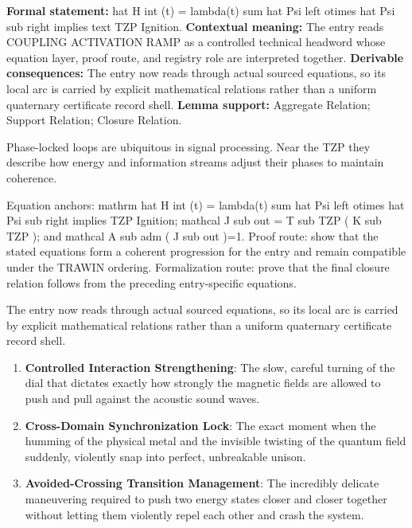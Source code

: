 \begingroup\footnotesize\setlength{\emergencystretch}{3em}\sloppy
\textbf{Formal statement:} hat H int (t) = lambda(t) sum hat Psi left otimes hat Psi sub right implies text TZP Ignition. \textbf{Contextual meaning:} The entry reads COUPLING ACTIVATION RAMP as a controlled technical headword whose equation layer, proof route, and registry role are interpreted together. \textbf{Derivable consequences:} The entry now reads through actual sourced equations, so its local arc is carried by explicit mathematical relations rather than a uniform quaternary certificate record shell. \textbf{Lemma support:} Aggregate Relation; Support Relation; Closure Relation.\par
\endgroup

Phase-locked loops are ubiquitous in signal processing. Near the TZP they describe how energy and information streams adjust their phases to maintain coherence.

Equation anchors: mathrm hat H int (t) = lambda(t) sum hat Psi left otimes hat Psi sub right implies TZP Ignition; mathcal J sub out = T sub TZP ( K sub TZP ); and mathcal A sub adm ( J sub out )=1. Proof route: show that the stated equations form a coherent progression for the entry and remain compatible under the TRAWIN ordering. Formalization route: prove that the final closure relation follows from the preceding entry-specific equations.

The entry now reads through actual sourced equations, so its local arc is carried by explicit mathematical relations rather than a uniform quaternary certificate record shell.
\endgroup

\begin{enumerate}[leftmargin=1.6em,itemsep=6pt,topsep=4pt]
\item \textbf{Controlled Interaction Strengthening}: The slow, careful turning of the dial that dictates exactly how strongly the magnetic fields are allowed to push and pull against the acoustic sound waves.
\item \textbf{Cross-Domain Synchronization Lock}: The exact moment when the humming of the physical metal and the invisible twisting of the quantum field suddenly, violently snap into perfect, unbreakable unison.
\item \textbf{Avoided-Crossing Transition Management}: The incredibly delicate maneuvering required to push two energy states closer and closer together without letting them violently repel each other and crash the system.
\end{enumerate}

